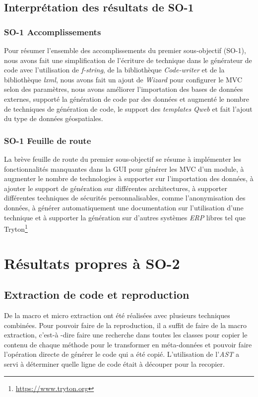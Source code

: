 
\subsection{Interprétation des résultats de SO-1}

\subsubsection{SO-1 Accomplissements}
Pour résumer l'ensemble des accomplissements du premier sous-objectif (SO-1), nous avons fait une simplification de l’écriture de technique dans le générateur de code avec l’utilisation de \textit{f-string}, de la bibliothèque \textit{Code-writer }et de la bibliothèque \textit{lxml}, nous avons fait un ajout de \textit{Wizard} pour configurer le MVC selon des paramètres, nous avons améliorer l’importation des bases de données externes, supporté la génération de code par des données et augmenté le nombre de techniques de génération de code, le support des \textit{templates} \textit{Qweb} et fait l'ajout du type de données géospatiales.

\subsubsection{SO-1 Feuille de route}
La brève feuille de route du premier sous-objectif se résume à implémenter les fonctionnalités manquantes dans la GUI pour générer les MVC d’un module, à augmenter le nombre de technologies à supporter sur l'importation des données, à ajouter le support de génération sur différentes architectures, à supporter différentes techniques de sécurités personnalisables, comme l’anonymisation des données, à générer automatiquement une documentation sur l’utilisation d’une technique et à supporter la génération sur d’autres systèmes \textit{ERP} libres tel que Tryton\footnote{\url{https://www.tryton.org}}

\section{Résultats propres à SO-2}

\subsection {Extraction de code et reproduction}

De la macro et micro extraction ont été réalisées avec plusieurs techniques combinées. Pour pouvoir faire de la reproduction, il a suffit de faire de la macro extraction, c'est-à -dire faire une recherche dans toutes les classes pour copier le contenu de chaque méthode pour le transformer en méta-données et pouvoir faire l’opération directe de générer le code qui a été copié. L’utilisation de l’\textit{AST} a servi à déterminer quelle ligne de code était à découper pour la recopier.

